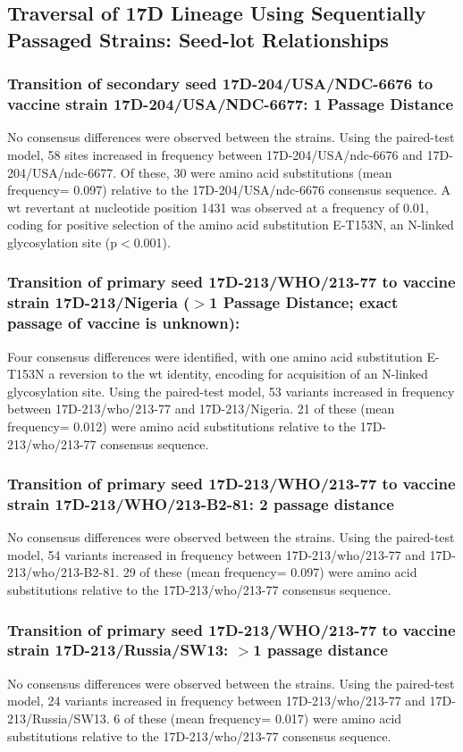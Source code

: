 	\subsection{Traversal of 17D Lineage Using Sequentially Passaged Strains: Seed-lot Relationships}
	\subsubsection{Transition of secondary seed 17D-204/USA/NDC-6676 to vaccine strain 17D-204/USA/NDC-6677: 1 Passage Distance}
No consensus differences were observed between the strains. Using the paired-test model, 58 sites increased in frequency between 17D-204/USA/\gls{ndc}-6676 and 17D-204/USA/\gls{ndc}-6677. Of these, 30 were amino acid substitutions (mean frequency= 0.097) relative to the 17D-204/USA/\gls{ndc}-6676 consensus sequence. A \gls{wt} revertant at nucleotide position 1431 was observed at a frequency of 0.01, coding for positive selection of the amino acid substitution E-T153N, an N-linked glycosylation site (p$<$0.001).
	\subsubsection{Transition of primary seed 17D-213/WHO/213-77 to vaccine strain 17D-213/Nigeria ($>$1 Passage Distance; exact passage of vaccine is unknown):}
Four consensus differences were identified, with one amino acid substitution E-T153N a reversion to the \gls{wt} identity, encoding for acquisition of an N-linked glycosylation site. Using the paired-test model, 53 variants increased in frequency between 17D-213/\gls{who}/213-77 and 17D-213/Nigeria. 21 of these (mean frequency= 0.012) were amino acid substitutions relative to the 17D-213/\gls{who}/213-77 consensus sequence.
	\subsubsection{Transition of primary seed 17D-213/WHO/213-77 to vaccine strain 17D-213/WHO/213-B2-81: 2 passage distance}
No consensus differences were observed between the strains. Using the paired-test model, 54 variants increased in frequency between 17D-213/\gls{who}/213-77 and 17D-213/\gls{who}/213-B2-81. 29 of these (mean frequency= 0.097) were amino acid substitutions relative to the 17D-213/\gls{who}/213-77 consensus sequence.  
	\subsubsection{Transition of primary seed 17D-213/WHO/213-77 to vaccine strain 17D-213/Russia/SW13: $>$1 passage distance}
No consensus differences were observed between the strains. Using the paired-test model, 24 variants increased in frequency between 17D-213/\gls{who}/213-77 and 17D-213/Russia/SW13. 6 of these (mean frequency= 0.017) were amino acid substitutions relative to the 17D-213/\gls{who}/213-77 consensus sequence.
